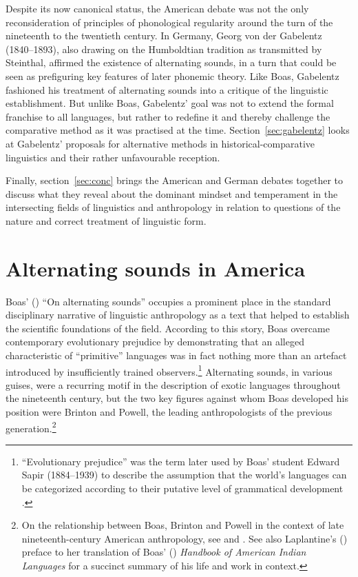 \documentclass[output=paper]{langscibook}
\begin{document}
Despite its now canonical status, the American debate was not the only reconsideration of principles of phonological regularity around the turn of the nineteenth to the twentieth century. In Germany, Georg von der Gabelentz (1840–1893), also drawing on the Humboldtian tradition as transmitted by Steinthal, affirmed the existence of alternating sounds, in a turn that could be seen as prefiguring key features of later phonemic theory. Like Boas, Gabelentz fashioned his treatment of alternating sounds into a critique of the linguistic establishment. But unlike Boas, Gabelentz' goal was not to extend the formal franchise to all languages, but rather to redefine it and thereby challenge the comparative method as it was practised at the time. Section~\ref{sec:gabelentz} looks at Gabelentz' proposals for alternative methods in historical-comparative linguistics and their rather unfavourable reception. 

Finally, section~\ref{sec:conc} brings the American and German debates together to discuss what they reveal about the dominant mindset and temperament in the intersecting fields of linguistics and anthropology in relation to questions of the nature and correct treatment of linguistic form.

\section{Alternating sounds in America}
\label{sec:america}

Boas' (\citeyear{Boas1889}) ``On alternating sounds'' occupies a prominent place in the standard disciplinary narrative of linguistic anthropology as a text that helped to establish the scientific foundations of the field. According to this story, Boas overcame contemporary evolutionary prejudice by demonstrating that an alleged characteristic of ``primitive'' languages was in fact nothing more than an artefact introduced by insufficiently trained observers.\footnote{``Evolutionary prejudice'' was the term later used by Boas' student Edward Sapir (1884–1939) to describe the assumption that the world's languages can be categorized according to their putative level of grammatical development \citep[see][130-132]{Sapir1921}.} Alternating sounds, in various guises, were a recurring motif in the description of exotic languages throughout the nineteenth century, but the two key figures against whom Boas developed his position were Brinton and Powell, the leading anthropologists of the previous generation.\footnote{On the relationship between Boas, Brinton and Powell in the context of late nineteenth-century American anthropology, see \citet{Darnell1988} and \citet{Darnell1998}. See also Laplantine's (\citeyear{Laplantine2018}) preface to her translation of Boas' (\citeyear{Boas1911}) \emph{Handbook of American Indian Languages} for a succinct summary of his life and work in context.}
\end{document}
